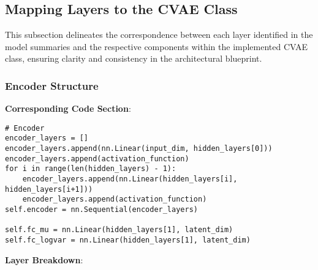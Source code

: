 \documentclass[10pt]{article}
\begin{document}
\subsection{Mapping Layers to the CVAE Class}

This subsection delineates the correspondence between each layer identified in the model summaries and the respective components within the implemented CVAE class, ensuring clarity and consistency in the architectural blueprint.

\subsubsection{Encoder Structure}

\textbf{Corresponding Code Section}:
\begin{verbatim}
# Encoder
encoder_layers = []
encoder_layers.append(nn.Linear(input_dim, hidden_layers[0]))
encoder_layers.append(activation_function)
for i in range(len(hidden_layers) - 1):
    encoder_layers.append(nn.Linear(hidden_layers[i], hidden_layers[i+1]))
    encoder_layers.append(activation_function)
self.encoder = nn.Sequential(encoder_layers)

self.fc_mu = nn.Linear(hidden_layers[1], latent_dim)
self.fc_logvar = nn.Linear(hidden_layers[1], latent_dim)
\end{verbatim}

\textbf{Layer Breakdown}:
\end{document}
